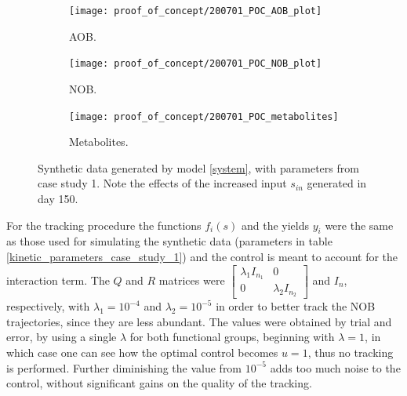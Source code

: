 \documentclass[processes,article,submit,moreauthors,pdftex]{Definitions/mdpi}
\begin{document}
\begin{figure}[h]
	\centering
	\begin{subfigure}{0.32 \linewidth}
		\texttt{[image: proof\_of\_concept/200701\_POC\_AOB\_plot]}
		\caption{AOB.}
		\label{PC_synthetic_AOB}
	\end{subfigure}
	\begin{subfigure}{0.32 \linewidth}
		\centering
		\texttt{[image: proof\_of\_concept/200701\_POC\_NOB\_plot]}
		\caption{NOB.}
		\label{PC_synthetic_NOB}
	\end{subfigure}
	\begin{subfigure}{0.32 \linewidth}
		\centering
		\texttt{[image: proof\_of\_concept/200701\_POC\_metabolites]}
		\caption{Metabolites.}
		\label{PC_synthetic_metabolites}
	\end{subfigure}
	\caption{Synthetic data generated by model \eqref{system}, with parameters from case study 1. Note the effects of the increased input $s_{in}$ generated in day 150.}
	\label{synthetic_data}
\end{figure}






For the tracking procedure the functions $f_i(s)$ and the yields $y_i$ were the same as those used for simulating the synthetic data (parameters in table \ref{kinetic_parameters_case_study_1}) and the control is meant to account for the interaction term. The $Q$ and $R$ matrices were $\begin{bmatrix}
\lambda_1 I_{n_1} &0  \\ 0& \lambda_2 I_{n_2}
\end{bmatrix}$ and $I_n$, respectively, with $\lambda_1 = 10^{-4}$ and $\lambda_2 = 10^{-5}$ in order to better track the NOB trajectories, since they are less abundant. The values were obtained by trial and error, by using a single $\lambda$ for both functional groups, beginning with $\lambda = 1$, in which case one can see how the optimal control becomes $u = 1$, thus no tracking is performed. Further diminishing the value from $10^{-5}$ adds too much noise to the control, without significant gains on the quality of the tracking.
\end{document}
